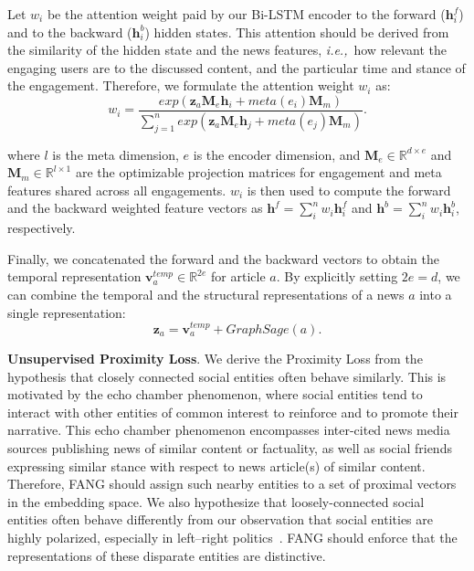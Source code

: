 \documentclass[sigconf]{acmart}
\theoremstyle{definition}
\theoremstyle{hypothesis}
\begin{document}
Let $w_i$ be the attention weight paid by our Bi-LSTM encoder to the forward ($\boldsymbol{h}^f_i$) and to the backward ($\boldsymbol{h}^b_i$) hidden states. This attention should be derived from the similarity of the hidden state and the news features, \textit{i.e.,}~how relevant the engaging users are to the discussed content, and the particular time and stance of the engagement. Therefore, we formulate the attention weight $w_i$ as:
\begin{equation}
    w_i = \frac{exp(\boldsymbol{z}_a \mathbf{M}_e  \boldsymbol{h}_i + meta(e_i) \mathbf{M}_m)}{\sum^n_{j=1}exp(\boldsymbol{z}_a \mathbf{M}_e \boldsymbol{h}_j + meta(e_j) \mathbf{M}_m)}.
\end{equation}

\noindent where $l$ is the meta dimension, $e$ is the encoder dimension, and $\mathbf{M}_e\in \mathbb{R}^{d\times e}$ and $\mathbf{M}_m\in \mathbb{R}^{l\times 1}$ are the optimizable projection matrices for engagement and meta features shared across all engagements. $w_i$ is then used to compute the forward and the backward weighted feature vectors as $\boldsymbol{h}^f=\sum^n_i w_i \boldsymbol{h}^f_i$ and $\boldsymbol{h}^b=\sum^n_i w_i \boldsymbol{h}^b_i$, respectively.

Finally, we concatenated the forward and the backward vectors to obtain the temporal representation $\boldsymbol{v}^{temp}_{a}\in\mathbb{R}^{2e}$ for article $a$. By explicitly setting $2e=d$, we can combine the temporal and the structural representations of a news $a$ into a single representation: 
\begin{equation}\label{eq:news_rep}
    \boldsymbol{z}_a=\boldsymbol{v}^{temp}_{a} + GraphSage(a).     
\end{equation}

\textbf{Unsupervised Proximity Loss}. We derive the Proximity Loss from the hypothesis that closely connected social entities often behave similarly. This is motivated by the echo chamber phenomenon, where social entities tend to interact with other entities of common interest to reinforce and to promote their narrative. This echo chamber phenomenon encompasses inter-cited news media sources publishing news of similar content or factuality, as well as social friends expressing similar stance with respect to news article(s) of similar content. Therefore, FANG should assign such nearby entities to a set of proximal vectors in the embedding space. We also hypothesize that loosely-connected social entities often behave differently from our observation that social entities are highly polarized, especially in left--right politics~\cite{boxell2017internet}. FANG should enforce that the representations of these disparate entities are distinctive.
\end{document}
